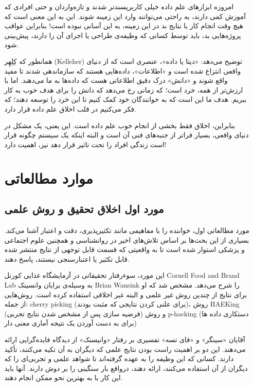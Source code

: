 \documentclass[10pt,oneside]{book}
\begin{document}
    امروزه ابزارهای علم داده خیلی کاربرپسندتر شدند و تازه‌واردان و حتی افرادی که آموزش کمی دارند، به راحتی می‌توانند وارد این زمینه شوند.
    این به این معنی است که هیچ وقت انجام کار با نتایج بد در این زمینه، به این آسانی نبوده است!
    بنابراین عواقب پروژه‌هایی بد، باید توسط کسانی که وظیفه‌ی طراحی یا اجرای آن را دارند، پیش‌بینی شود.

    همانطور که کِلِهِر (Kelleher) توضیح می‌دهد: «دیتا یا داده»، عنصری است که از دنیای واقعی انتزاع شده است و «اطلاعات»، داده‌هایی هستند که سازماندهی شدند تا مفید واقع شوند و «دانش» درک دقیق اطلاعاتی هست که داده‌ها به ما می‌دهند.
    اما با ارزش‌تر از همه، خرد است؛ که زمانی رخ می‌دهد که دانش را برای هدف خوب به کار ببریم.
    هدف ما این است که به خوانندگان خود کمک کنیم تا این خرد را توسعه دهند؛ که فکر می‌کنیم در قلب اخلاق علم داده قرار دارد.

    بنابراین، اخلاق فقط بخشی از انجام خوب علم داده است.
    این یعنی، یک مشکل در دنیای واقعی، بسیار فراتر از جنبه‌های فنی آن است و البته اینکه یک سیستم چگونه قرار است زندگی افراد را تحت تاثیر قرار دهد نیز، اهمیت دارد!

    \section{موارد مطالعاتی}

    \subsection{مورد اول اخلاق تحقیق و روش علمی}
    \paragraph{}
    مورد مطالعاتی اول، خواننده را با مفاهیمی مانند تکثیرپذیری، دقت و اعتبار آشنا می‌کند.
    بسیاری از این بحث‌ها بر اساس تلاش‌های اخیر در روانشناسی و همچنین علوم اجتماعی و پزشکی استوار شده است تا به واقعیتی که قسمت قابل توجهی از نتایج منتشر شده قابل تکثیر یا اعتبارسنجی نیستند، پاسخ دهند.

    این مورد، سوءرفتار تحقیقاتی در آزمایشگاه غذایی کورنل Cornell Food and Brand Lab به وسیله‌ی برایان وانسینک Brian Wansink را شرح می‌دهد.
    مشخص شد که او برای نتایج از چندین روش غیر علمی و البته غیر اخلاقی استفاده کرده است.
    روش‌هایی از جمله: cherry picking (برای علنی کردن نتایجی که مثبت بودند)، روش HAEKing (فرضیه سازی پس از مشخص شدن نتایج تجربی) و روش p-hacking (دستکاری داده ها برای به دست آوردن یک نتیجه آماری معنی دار)

    آقایان «سینگر» و «فای تسه» تفسیری بر رفتار «وانیسنک» از دیدگاه فایده‌گرایی ارائه می‌دهند.
    این دو بر اهمیت راست بودن نتایج علمی که دیگران به آن تکیه می‌کنند، تأکید دارند.
    کسانی که این وظیفه را به عهده گرفته‌اند تا شواهد علمی و تجربی‌ای را که دیگران از آن استفاده می‌کنند، ارائه دهند، درواقع بار سنگینی را بر دوش دارند.
    آنها باید این کار با به بهترین نحو ممکن انجام دهند.
\end{document}
